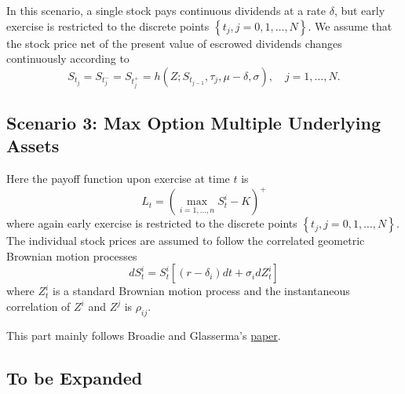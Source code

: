 \documentclass[margin=1in]{article}
\begin{document}
	 In this scenario, a single stock pays continuous dividends at a rate $\delta$, but early exercise is restricted to the discrete points $\left\{t_{j}, j=0,1, \ldots, N\right\}$. We assume that the stock price net of the present value of escrowed dividends changes continuously according to
	 $$
	 S_{t_{j}}=S_{t_{j}^{-}}=S_{t_{j}^{+}}=h\left(Z ; S_{t_{j-1}}, \tau_{j}, \mu-\delta, \sigma\right), \quad j=1, \ldots, N .
	 $$
	 
	 \subsection*{Scenario 3: Max Option Multiple Underlying Assets}
	 
	 Here the payoff function upon exercise at time $t$ is
	 $$
	 	L_{t}=\left(\max _{i=1, \ldots, n} S_{t}^{i}-K\right)^{+} 
	 $$
	 where again early exercise is restricted to the discrete points $\left\{t_{j}, j=0,1, \ldots, N\right\}$. The individual stock prices are assumed to follow the correlated geometric Brownian motion processes
	 $$
	 d S_{t}^{i}=S_{t}^{i}\left[\left(r-\delta_{i}\right) d t+\sigma_{i} d Z_{t}^{i}\right]
	 $$
	 where $Z_{t}^{i}$ is a standard Brownian motion process and the instantaneous correlation of $Z^{i}$ and $Z^{j}$ is $\rho_{i j}$.
	 
	 This part mainly follows Broadie and Glasserma's 
	 \href{https://www.columbia.edu/~mnb2/broadie/Assets/v7n4a3_Broadie.pdf}{paper}.
	 
	 \subsection*{To be Expanded}
	 
	 
	
\end{document}
